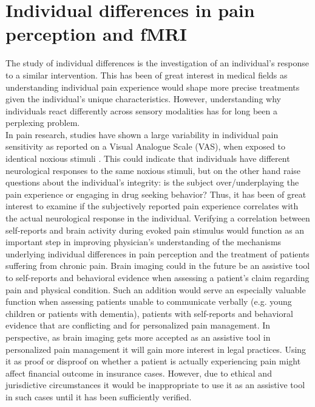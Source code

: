 \section{Individual differences in pain perception and fMRI}
The study of individual differences is the investigation of an individual’s response to a similar intervention. This has been of great interest in medical fields as understanding individual pain experience would shape more precise treatments given the individual’s unique characteristics. However, understanding why individuals react differently across sensory modalities has for long been a perplexing problem. \\
In pain research, studies have shown a large variability in individual pain sensitivity as reported on a Visual Analogue Scale (VAS), when exposed to identical noxious stimuli \cite{Nielsen2008, Coghill2003}. This could indicate that individuals have different neurological responses to the same noxious stimuli, but on the other hand raise questions about the individual's integrity: is the subject over/underplaying the pain experience or engaging in drug seeking behavior? Thus, it has been of great interest to examine if the subjectively reported pain experience correlates with the actual neurological response in the individual. \cite{Coghill2011} Verifying a correlation between self-reports and brain activity during evoked pain stimulus would function as an important step in improving physician’s understanding of the mechanisms underlying individual differences in pain perception and the treatment of patients suffering from chronic pain. Brain imaging could in the future be an assistive tool to self-reports and behavioral evidence when assessing a patient’s claim regarding pain and physical condition. Such an addition would serve an especially valuable function when assessing patients unable to communicate verbally (e.g. young children or patients with dementia), patients with self-reports and behavioral evidence that are conflicting and for personalized pain management. In perspective, as brain imaging gets more accepted as an assistive tool in personalized pain management it will gain more interest in legal practices. Using it as proof or disproof on whether a patient is actually experiencing pain might affect financial outcome in insurance cases. However, due to ethical and jurisdictive circumstances it would be inappropriate to use it as an assistive tool in such cases until it has been sufficiently verified. \cite{Davis2017} \\
